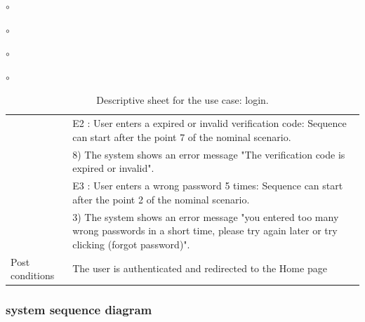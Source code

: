 \documentclass[]{uc2pfecaneva}
\begin{document}
\begin{list}{$\circ$}{}
\begin{list}{$\circ$}{}
\begin{list}{$\circ$}{}
\begin{list}{$\circ$}{}
\begin{table}[h]
\begin{tabularx}{\textwidth}{|l|X|}
            & E2 : User enters a expired or invalid verification code: Sequence can start after the point 7 of the nominal scenario.                                               \\
            & \hspace{4mm}8) The system shows an error message "The verification code is expired or invalid".                                                                    \\
            & E3 : User enters a wrong password 5 times: Sequence can start after the point 2 of the nominal scenario.                                                             \\
            & \hspace{4mm}3) The system shows an error message "you entered too many wrong passwords in a short time, please try again later or try clicking (forgot password)". \\
            Post conditions
            & The user is authenticated and redirected to the Home page                                                                                                            \\ \hline
        \end{tabularx}
        \caption{Descriptive sheet for the use case: login.}
        \label{table:1}
    \end{table}
    \clearpage

    \subsubsection{system sequence diagram}
    \begin{figure}[h]


\end{figure}
\end{list}
\end{list}
\end{list}
\end{list}
\end{document}
